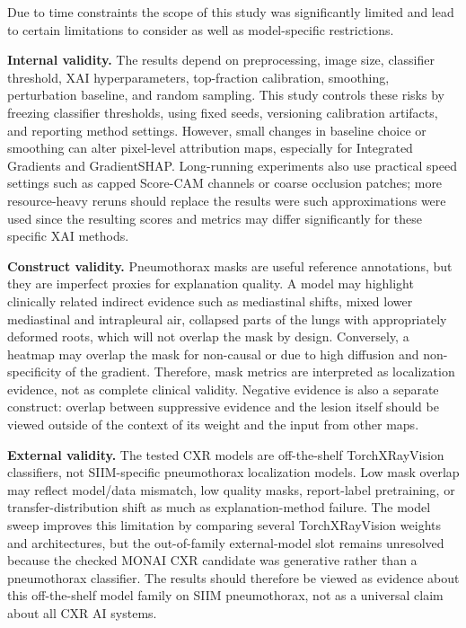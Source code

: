 Due to time constraints the scope of this study was significantly limited 
and lead to certain limitations to consider as well as model-specific 
restrictions.

\textbf{Internal validity.} The results depend on preprocessing, image
size, classifier threshold, XAI hyperparameters, top-fraction
calibration, smoothing, perturbation baseline, and random sampling. This
study controls these risks by freezing classifier thresholds, using
fixed seeds, versioning calibration artifacts, and reporting method
settings. However, small changes in baseline choice or smoothing can
alter pixel-level attribution maps, especially for
Integrated Gradients and GradientSHAP. Long-running
experiments also use practical speed settings such as capped
Score-CAM channels or coarse occlusion patches; 
more resource-heavy reruns should replace the results were such approximations
were used since the resulting scores and metrics may differ significantly for 
these specific XAI methods.

\textbf{Construct validity.} Pneumothorax masks are useful reference
annotations, but they are imperfect proxies for explanation quality. A
model may highlight clinically related indirect evidence such as
mediastinal shifts, mixed lower mediastinal and intrapleural air, 
collapsed parts of the lungs with appropriately deformed roots,
which will not overlap the mask by design. 
Conversely, a heatmap may overlap the mask for non-causal or
due to high diffusion and non-specificity of the gradient. 
Therefore, mask metrics are interpreted as
localization evidence, not as complete clinical validity. Negative
evidence is also a separate construct: overlap between suppressive
evidence and the lesion itself should be viewed outside of the context 
of its weight and the input from other maps.

\textbf{External validity.} The tested CXR models are off-the-shelf
TorchXRayVision classifiers, not SIIM-specific pneumothorax localization
models. Low mask overlap may reflect model/data mismatch, low quality masks, 
report-label pretraining, or transfer-distribution shift
\cite{ref-cxr-generalization-zech} as much as explanation-method
failure. The model sweep improves this limitation by comparing
several TorchXRayVision weights and architectures, but the out-of-family
external-model slot remains unresolved because the checked MONAI CXR
candidate was generative rather than a pneumothorax classifier. The
results should therefore be viewed as evidence about this off-the-shelf
model family on SIIM pneumothorax, not as a universal claim about all
CXR AI systems.

